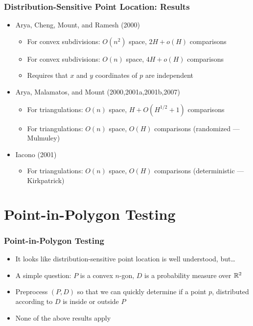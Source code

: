 \documentclass{beamer}
\begin{document}
\frame
{
   \frametitle{Distribution-Sensitive Point Location: Results}
   \begin{itemize}
   \item<1-> Arya, Cheng, Mount, and Ramesh (2000)
    \begin{itemize}
      \item<1->For convex subdivisions: $O(n^2)$ space, $2H+o(H)$ comparisons
      \item<1->For convex subdivisions: $O(n)$ space, $4H+o(H)$ comparisons
      \item<1->Requires that $x$ and $y$ coordinates of $p$ are independent
    \end{itemize}
   \item<2-> Arya, Malamatos, and Mount (2000,2001a,2001b,2007)
    \begin{itemize}
      \item<2->For triangulations: $O(n)$ space, $H+O(H^{1/2}+1)$ comparisons
      \item<3->For triangulations: $O(n)$ space, $O(H)$ comparisons
(randomized --- Mulmuley)
    \end{itemize} 
    \item<4-> Iacono (2001)
    \begin{itemize}
      \item<4->For triangulations: $O(n)$ space, $O(H)$ comparisons
(deterministic --- Kirkpatrick)
    \end{itemize} 
   \end{itemize}


}

\section{Point-in-Polygon Testing}
\frame
{
   \frametitle{Point-in-Polygon Testing}
   \begin{itemize}
   \item<1-> It looks like distribution-sensitive point location is 
	well understood, but\ldots
   \item<2-> A simple question: $P$ is a convex $n$-gon, $D$ is a
	probability measure over $\mathbb{R}^2$
   \item<3-> Preprocess $(P,D)$ so that we can quickly determine if a
point $p$, distributed according to $D$ is inside or outside $P$
   \item<4-> None of the above results apply
   \end{itemize}
}
\end{document}
